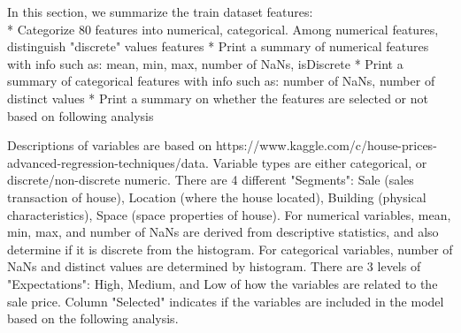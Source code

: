 \documentclass[11pt]{article}
\begin{document}
    In this section, we summarize the train dataset features:\\
* Categorize 80 features into numerical, categorical. Among numerical
features, distinguish "discrete" values features * Print a summary of
numerical features with info such as: mean, min, max, number of NaNs,
isDiscrete * Print a summary of categorical features with info such as:
number of NaNs, number of distinct values * Print a summary on whether
the features are selected or not based on following analysis

    Descriptions of variables are based on
https://www.kaggle.com/c/house-prices-advanced-regression-techniques/data.
Variable types are either categorical, or discrete/non-discrete numeric.
There are 4 different "Segments": Sale (sales transaction of house),
Location (where the house located), Building (physical characteristics),
Space (space properties of house). For numerical variables, mean, min,
max, and number of NaNs are derived from descriptive statistics, and
also determine if it is discrete from the histogram. For categorical
variables, number of NaNs and distinct values are determined by
histogram. There are 3 levels of "Expectations": High, Medium, and Low
of how the variables are related to the sale price. Column "Selected"
indicates if the variables are included in the model based on the
following analysis.
\end{document}
